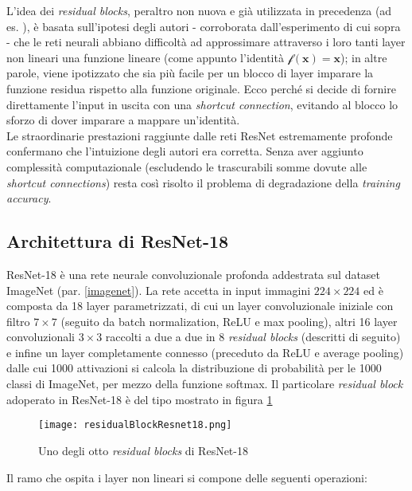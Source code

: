 L'idea dei \textit{residual blocks}, peraltro non nuova e già utilizzata in precedenza (ad es. \cite{highway}), è basata sull'ipotesi degli autori - corroborata dall'esperimento di cui sopra - che le reti neurali abbiano difficoltà ad approssimare attraverso i loro tanti layer non lineari una funzione lineare (come appunto l'identità $\mathcal{f}(\mathbf{x})=\mathbf{x}$); in altre parole, viene ipotizzato che sia più facile per un blocco di layer imparare la funzione residua rispetto alla funzione originale. Ecco perché si decide di fornire direttamente l'input in uscita con una \textit{shortcut connection}, evitando al blocco lo sforzo di dover imparare a mappare un'identità.\\

Le straordinarie prestazioni raggiunte dalle reti ResNet estremamente profonde confermano che l'intuizione degli autori era corretta. Senza aver aggiunto complessità computazionale (escludendo le trascurabili somme dovute alle \textit{shortcut connections}) resta così risolto il problema di degradazione della \textit{training accuracy}.

\subsection{Architettura di ResNet-18}
ResNet-18 è una rete neurale convoluzionale profonda addestrata sul dataset ImageNet (par. \ref{imagenet}). La rete accetta in input immagini $224\times 224$ ed è composta da 18 layer parametrizzati, di cui un layer convoluzionale iniziale con filtro $7\times 7$ (seguito da batch normalization, ReLU e max pooling), altri 16 layer convoluzionali $3\times 3$ raccolti a due a due in 8 \textit{residual blocks} (descritti di seguito) e infine  un layer completamente connesso (preceduto da ReLU e average pooling) dalle cui 1000 attivazioni si calcola la distribuzione di probabilità per le 1000 classi di ImageNet, per mezzo della funzione softmax.
Il particolare \textit{residual block} adoperato in ResNet-18 è del tipo mostrato in figura \ref{fig:residualBlockResnet18}

\begin{figure}[H]
\centering
\texttt{[image: residualBlockResnet18.png]}
\caption{Uno degli otto \textit{residual blocks} di ResNet-18}
\label{fig:residualBlockResnet18}
\end{figure}

Il ramo che ospita i layer non lineari si compone delle seguenti operazioni:

